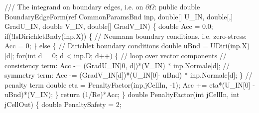 {    /// The integrand on boundary edges, i.e. on $\partial \Omega$:
\btab public double BoundaryEdgeForm(ref CommonParamsBnd inp, \newline 
\btab \btab double[] U\_IN, double[,] GradU\_IN, double V\_IN, double[] GradV\_IN) \{\newline 
 \newline 
 \newline 
\btab \btab double Acc = 0.0;\newline 
 \newline 
\btab \btab if(!IsDirichletBndy(inp.X)) \{\newline 
\btab \btab \btab // Neumann boundary conditions, i.e. zero-stress:\newline 
\btab \btab \btab Acc = 0;\newline 
\btab \btab \} else \{\newline 
\btab \btab \btab // Dirichlet boundary conditions\newline 
\btab \btab \btab double uBnd = UDiri(inp.X)[d];\newline 
 \newline 
\btab \btab \btab for(int d = 0; d < inp.D; d++) \{ // loop over vector components \newline 
\btab \btab \btab \btab // consistency term:\newline 
\btab \btab \btab \btab Acc -= (GradU\_IN[0, d])*(V\_IN) * inp.Normale[d];\newline 
\btab \btab \btab \btab // symmetry term:\newline 
\btab \btab \btab \btab Acc -= (GradV\_IN[d])*(U\_IN[0]- uBnd) * inp.Normale[d];\newline 
\btab \btab \btab \}\newline 
 \newline 
\btab \btab \btab // penalty term\newline 
\btab \btab \btab double eta = PenaltyFactor(inp.jCellIn, -1);\newline 
\btab \btab \btab Acc += eta*(U\_IN[0] - uBnd)*(V\_IN);\newline 
\btab \btab \}\newline 
 \newline 
\btab \btab return (1/Re)*Acc;\newline 
\btab \}\newline 
 \newline 
\btab double PenaltyFactor(int jCellIn, int jCellOut) \{\newline 
\btab \btab double PenaltySafety = 2;\newline 
}

